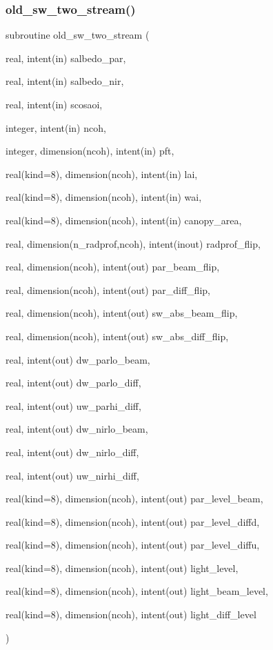 \subsubsection{\texorpdfstring{old\+\_\+sw\+\_\+two\+\_\+stream()}{old\_sw\_two\_stream()}}
{\footnotesize\ttfamily subroutine old\+\_\+sw\+\_\+two\+\_\+stream (\begin{DoxyParamCaption}\item[{real, intent(in)}]{salbedo\+\_\+par,  }\item[{real, intent(in)}]{salbedo\+\_\+nir,  }\item[{real, intent(in)}]{scosaoi,  }\item[{integer, intent(in)}]{ncoh,  }\item[{integer, dimension(ncoh), intent(in)}]{pft,  }\item[{real(kind=8), dimension(ncoh), intent(in)}]{lai,  }\item[{real(kind=8), dimension(ncoh), intent(in)}]{wai,  }\item[{real(kind=8), dimension(ncoh), intent(in)}]{canopy\+\_\+area,  }\item[{real, dimension(n\+\_\+radprof,ncoh), intent(inout)}]{radprof\+\_\+flip,  }\item[{real, dimension(ncoh), intent(out)}]{par\+\_\+beam\+\_\+flip,  }\item[{real, dimension(ncoh), intent(out)}]{par\+\_\+diff\+\_\+flip,  }\item[{real, dimension(ncoh), intent(out)}]{sw\+\_\+abs\+\_\+beam\+\_\+flip,  }\item[{real, dimension(ncoh), intent(out)}]{sw\+\_\+abs\+\_\+diff\+\_\+flip,  }\item[{real, intent(out)}]{dw\+\_\+parlo\+\_\+beam,  }\item[{real, intent(out)}]{dw\+\_\+parlo\+\_\+diff,  }\item[{real, intent(out)}]{uw\+\_\+parhi\+\_\+diff,  }\item[{real, intent(out)}]{dw\+\_\+nirlo\+\_\+beam,  }\item[{real, intent(out)}]{dw\+\_\+nirlo\+\_\+diff,  }\item[{real, intent(out)}]{uw\+\_\+nirhi\+\_\+diff,  }\item[{real(kind=8), dimension(ncoh), intent(out)}]{par\+\_\+level\+\_\+beam,  }\item[{real(kind=8), dimension(ncoh), intent(out)}]{par\+\_\+level\+\_\+diffd,  }\item[{real(kind=8), dimension(ncoh), intent(out)}]{par\+\_\+level\+\_\+diffu,  }\item[{real(kind=8), dimension(ncoh), intent(out)}]{light\+\_\+level,  }\item[{real(kind=8), dimension(ncoh), intent(out)}]{light\+\_\+beam\+\_\+level,  }\item[{real(kind=8), dimension(ncoh), intent(out)}]{light\+\_\+diff\+\_\+level }\end{DoxyParamCaption})}

